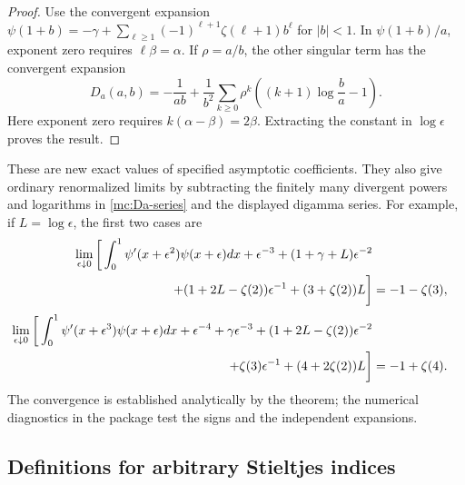 \begin{proof}
Use the convergent expansion
$\psi(1+b)=-\gamma+\sum_{\ell\ge1}(-1)^{\ell+1}
\zeta(\ell+1)b^\ell$ for $|b|<1$.
In $\psi(1+b)/a$, exponent zero requires $\ell\beta=\alpha$.
If $\rho=a/b$, the other singular term has the convergent expansion
\begin{equation}\label{mc:Da-series}
 D_a(a,b)=-\frac1{ab}
 +\frac1{b^2}\sum_{k\ge0}\rho^k
                   \left((k+1)\log\frac ba-1\right).
\end{equation}
Here exponent zero requires $k(\alpha-\beta)=2\beta$.
Extracting the constant in $\log\epsilon$ proves the result.
\end{proof}

These are new exact values of specified asymptotic coefficients.
They also give ordinary renormalized limits by subtracting the
finitely many divergent powers and logarithms in
\eqref{mc:Da-series} and the displayed digamma series. For example,
if $L=\log\epsilon$, the first two cases are
\begin{align}\label{mc:q2limit}
 \lim_{\epsilon\downarrow0}\bigg[
  \int_0^1\psi'(x+\epsilon^2)\psi(x+\epsilon)dx
   +\epsilon^{-3}+(1+\gamma+L)\epsilon^{-2}\notag\\
 \hspace{28mm}
   +(1+2L-\zeta(2))\epsilon^{-1}
   +(3+\zeta(2))L\bigg]
 &=-1-\zeta(3),\\[3pt]
 \lim_{\epsilon\downarrow0}\bigg[
  \int_0^1\psi'(x+\epsilon^3)\psi(x+\epsilon)dx
   +\epsilon^{-4}+\gamma\epsilon^{-3}
   +(1+2L-\zeta(2))\epsilon^{-2}\notag\\
 \hspace{28mm}
   +\zeta(3)\epsilon^{-1}
   +(4+2\zeta(2))L\bigg]
 &=-1+\zeta(4).
 \label{mc:q3limit}
\end{align}
The convergence is established analytically by the theorem;
the numerical diagnostics in the package test the signs and
the independent expansions.

\subsection{Definitions for arbitrary Stieltjes indices}

